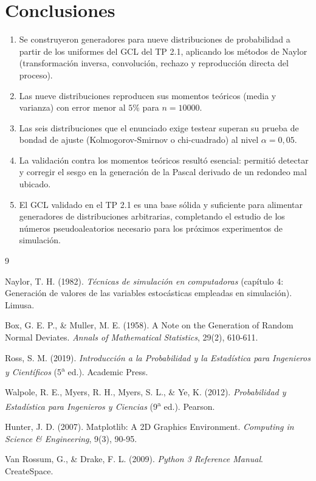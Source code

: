 \documentclass[11pt]{article}
\begin{document}
\section{Conclusiones}

\begin{enumerate}
  \item Se construyeron generadores para nueve distribuciones de
    probabilidad a partir de los uniformes del GCL del TP 2.1, aplicando los
    m\'etodos de Naylor (transformaci\'on inversa, convoluci\'on, rechazo y
    reproducci\'on directa del proceso).
  \item Las nueve distribuciones reproducen sus momentos te\'oricos (media y
    varianza) con error menor al $5\%$ para $n = 10000$.
  \item Las seis distribuciones que el enunciado exige testear superan su
    prueba de bondad de ajuste (Kolmogorov-Smirnov o chi-cuadrado) al nivel
    $\alpha = 0{,}05$.
  \item La validaci\'on contra los momentos te\'oricos result\'o esencial:
    permiti\'o detectar y corregir el sesgo en la generaci\'on de la Pascal
    derivado de un redondeo mal ubicado.
  \item El GCL validado en el TP 2.1 es una base s\'olida y suficiente para
    alimentar generadores de distribuciones arbitrarias, completando el
    estudio de los n\'umeros pseudoaleatorios necesario para los pr\'oximos
    experimentos de simulaci\'on.
\end{enumerate}

\begin{thebibliography}{9}

Naylor, T. H. (1982). \emph{T\'ecnicas de simulaci\'on en computadoras}
(cap\'itulo 4: Generaci\'on de valores de las variables estoc\'asticas
empleadas en simulaci\'on). Limusa.

Box, G. E. P., \& Muller, M. E. (1958). A Note on the Generation of Random
Normal Deviates. \emph{Annals of Mathematical Statistics}, 29(2), 610-611.

Ross, S. M. (2019). \emph{Introducci\'on a la Probabilidad y la
Estad\'istica para Ingenieros y Cient\'ificos} (5\textsuperscript{a} ed.).
Academic Press.

Walpole, R. E., Myers, R. H., Myers, S. L., \& Ye, K. (2012).
\emph{Probabilidad y Estad\'istica para Ingenieros y Ciencias}
(9\textsuperscript{a} ed.). Pearson.

Hunter, J. D. (2007). Matplotlib: A 2D Graphics Environment.
\emph{Computing in Science \& Engineering}, 9(3), 90-95.

Van Rossum, G., \& Drake, F. L. (2009). \emph{Python 3 Reference Manual}.
CreateSpace.

\end{thebibliography}
\end{document}
